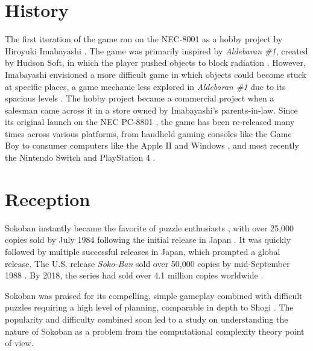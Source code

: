 \section{History}
The first iteration of the game ran on the NEC-8001 as a hobby project by Hiroyuki Imabayashi \cite{login1983thinkingrabbit}. The game was primarily inspired by \textit{Aldebaran \#1}, created by Hudson Soft, in which the player pushed objects to block radiation \cite{monthlymycom1980aldebaran, aguilera2020imabayashi}. However, Imabayashi envisioned a more difficult game in which objects could become stuck at specific places, a game mechanic less explored in \textit{Aldebaran \#1} due to its spacious levels \cite{sokoban_official_greetings}. The hobby project became a commercial project when a salesman came across it in a store owned by Imabayashi's parents-in-law. Since its original launch on the NEC PC-8801 \cite{popcom1984visiting}, the game has been re-released many times across various platforms, from handheld gaming consoles like the Game Boy \cite{atelier_double_history_1989} to consumer computers like the Apple II \cite{ellison1988whyjapan} and Windows \cite{sokoban_smart_official}, and most recently the Nintendo Switch and PlayStation 4 \cite{sokoban_official_lineup}.

\section{Reception}
Sokoban instantly became the favorite of puzzle enthusiasts \cite{tanaka1986thesokoban}, with over 25,000 copies sold by July 1984 following the initial release in Japan \cite{popcom1984strategy}. It was quickly followed by multiple successful releases in Japan, which prompted a global release. The U.S. release \textit{Soko-Ban} sold over 50,000 copies by mid-September 1988 \cite{ellison1988whyjapan}. By 2018, the series had sold over 4.1 million copies worldwide \cite{atpress2018chukyo}.

Sokoban was praised for its compelling, simple gameplay combined with difficult puzzles requiring a high level of planning, comparable in depth to Shogi \cite{micomgames1983sokoban}. The popularity and difficulty combined soon led to a study on understanding the nature of Sokoban as a problem from the computational complexity theory point of view.

